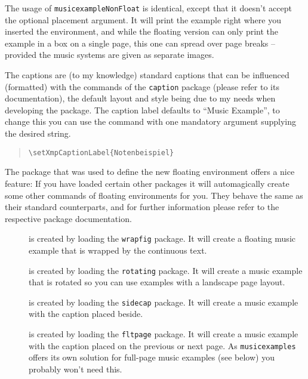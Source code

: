 \documentclass{OLLbook}
\begin{document}
The usage of \texttt{musicexampleNonFloat} is identical, except that it doesn't accept the optional placement argument.
It will print the example right where you inserted the environment, and while the floating version can only print the example in a box on a single page, this one can spread over page breaks -- provided the music systems are given as separate images.

The captions are (to my knowledge) standard captions that can be influenced (formatted) with the commands of the \texttt{caption} package (please refer to its documentation), the default layout and style being due to my needs when developing the package.
The caption label defaults to “Music Example”, to change this you can use the command  with one mandatory argument supplying the desired string.
\begin{quote}
\begin{verbatim}
\setXmpCaptionLabel{Notenbeispiel}
\end{verbatim}
\end{quote}

The  package that was used to define the new floating environment offers a nice feature:
If you have loaded certain other packages it will automagically create some other commands of floating environments for you.
They behave the same as their standard counterparts, and for further information please refer to the respective package documentation.

\begin{description}
\item[] is created by loading the \texttt{wrapfig} package.
It will create a floating music example that is wrapped by the continuous text.
\item[] is created by loading the \texttt{rotating} package.
It will create a music example that is rotated so you can use examples with a landscape page layout.
\item[] is created by loading the \texttt{sidecap} package.
It will create a music example with the caption placed beside.
\item[{}] is created by loading the \texttt{fltpage} package.
It will create a music example with the caption placed on the previous or next page.
As \texttt{musicexamples} offers its own solution for full-page music examples (see below) you probably won't need this.
\end{description}
\end{document}
